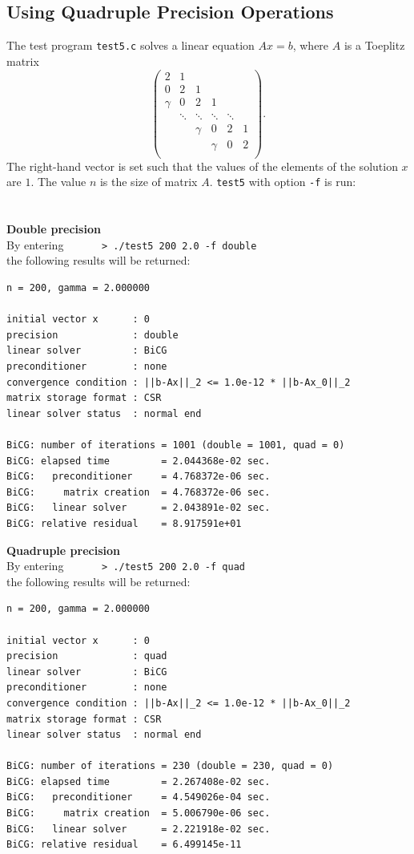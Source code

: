\documentclass[a4paper]{article}
\begin{document}
\subsection{Using Quadruple Precision Operations}
\label{sec:testprog5}
The test program \verb|test5.c| solves a linear equation $Ax =b$, where $A$ is a Toeplitz matrix
\[
\left(
\begin{array}{cccccc}
2 & 1 &   &  &  & \\
0 & 2 & 1 &  &  & \\
\gamma & 0& 2 & 1 &  & \\
 & \ddots & \ddots & \ddots & \ddots & \\
 &  &   \gamma &0 &       2   & 1 \\
 &  &  &   \gamma & 0& 2 \\
\end{array}
\right).
\]
The right-hand vector is set such that the values of the elements 
of the solution $x$ are $1$. The value $n$ is the size of matrix $A$.
\verb|test5| with option {\tt -f} is run: \\
\\ \\
\noindent
{\bf Double precision}\\
By entering
\verb+      > ./test5 200 2.0 -f double+\\
the following results will be returned:

\begin{verbatim}
n = 200, gamma = 2.000000

initial vector x      : 0
precision             : double
linear solver         : BiCG
preconditioner        : none
convergence condition : ||b-Ax||_2 <= 1.0e-12 * ||b-Ax_0||_2
matrix storage format : CSR
linear solver status  : normal end

BiCG: number of iterations = 1001 (double = 1001, quad = 0)
BiCG: elapsed time         = 2.044368e-02 sec.
BiCG:   preconditioner     = 4.768372e-06 sec. 
BiCG:     matrix creation  = 4.768372e-06 sec.
BiCG:   linear solver      = 2.043891e-02 sec.
BiCG: relative residual    = 8.917591e+01
\end{verbatim}

\noindent
{\bf Quadruple precision}\\
By entering
\verb+      > ./test5 200 2.0 -f quad+\\
the following results will be returned:

\begin{verbatim}
n = 200, gamma = 2.000000

initial vector x      : 0
precision             : quad
linear solver         : BiCG
preconditioner        : none
convergence condition : ||b-Ax||_2 <= 1.0e-12 * ||b-Ax_0||_2
matrix storage format : CSR
linear solver status  : normal end

BiCG: number of iterations = 230 (double = 230, quad = 0)
BiCG: elapsed time         = 2.267408e-02 sec.
BiCG:   preconditioner     = 4.549026e-04 sec. 
BiCG:     matrix creation  = 5.006790e-06 sec.
BiCG:   linear solver      = 2.221918e-02 sec.
BiCG: relative residual    = 6.499145e-11
\end{verbatim}
\end{document}
